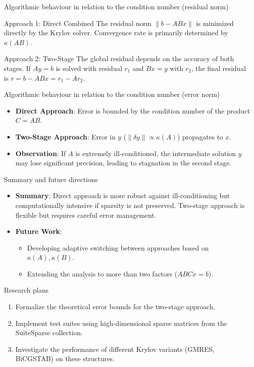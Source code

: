 \documentclass[aspectratio=169]{beamer}
\begin{document}
\begin{frame}{Algorithmic behaviour in relation to the condition number (residual norm)}
	\begin{block}{Approach 1: Direct Combined}
		The residual norm $\|b - ABx\|$ is minimized directly by the Krylov solver. Convergence rate is primarily determined by $\kappa(AB)$.
	\end{block}
	\begin{block}{Approach 2: Two-Stage}
		The global residual depends on the accuracy of both stages. 
		If $Ay=b$ is solved with residual $r_1$ and $Bx=y$ with $r_2$, the final residual is $r = b - ABx = r_1 - Ar_2$.
	\end{block}
\end{frame}
\begin{frame}{Algorithmic behaviour in relation to the condition number (error norm)}
	\begin{itemize}
		\item \textbf{Direct Approach}: Error is bounded by the condition number of the product $C = AB$.
		\item \textbf{Two-Stage Approach}: Error in $y$ ($\| \delta y \| \propto \kappa(A)$) propagates to $x$.
		\item \textbf{Observation}: If $A$ is extremely ill-conditioned, the intermediate solution $y$ may lose significant precision, leading to stagnation in the second stage.
	\end{itemize}
\end{frame}
\begin{frame}{Summary and future directions}
	\begin{itemize}
		\item \textbf{Summary}: Direct approach is more robust against ill-conditioning but computationally intensive if sparsity is not preserved. Two-stage approach is flexible but requires careful error management.
		\item \textbf{Future Work}: 
		\begin{itemize}
			\item Developing adaptive switching between approaches based on $\kappa(A), \kappa(B)$.
			\item Extending the analysis to more than two factors ($ABCx=b$).
		\end{itemize}
	\end{itemize}
\end{frame}
\begin{frame}{Research plans}
	\begin{enumerate}
		\item Formalize the theoretical error bounds for the two-stage approach.
		\item Implement test suites using high-dimensional sparse matrices from the SuiteSparse collection.
		\item Investigate the performance of different Krylov variants (GMRES, BiCGSTAB) on these structures.
	\end{enumerate}
\end{frame}
\end{document}
